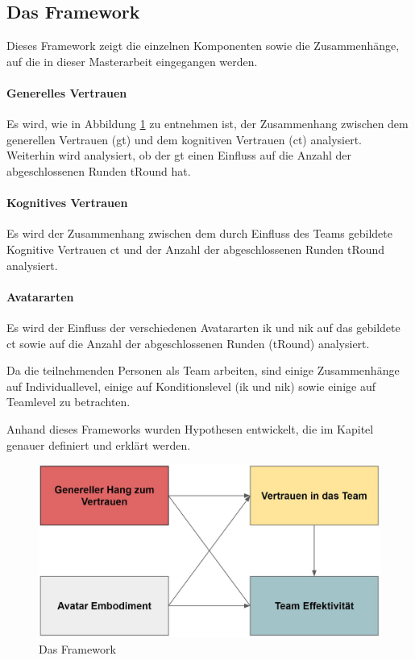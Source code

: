 \documentclass[a4paper,11pt]{article}%
\renewcommand{\\}{\vspace*{0.5\baselineskip} \newline}
\begin{document}
	\subsection{Das Framework}
Dieses Framework zeigt die einzelnen Komponenten sowie die Zusammenhänge, auf die in dieser Masterarbeit eingegangen werden. 

\paragraph{Generelles Vertrauen}
Es wird, wie in Abbildung \ref{Framework} zu entnehmen ist, der Zusammenhang zwischen dem generellen Vertrauen (\ac{gt}) und dem kognitiven Vertrauen (\ac{ct}) analysiert.
Weiterhin wird analysiert, ob der \ac{gt} einen Einfluss auf die Anzahl der abgeschlossenen Runden \ac{tRound} hat.

\paragraph{Kognitives Vertrauen}
Es wird der Zusammenhang zwischen dem durch Einfluss des Teams gebildete Kognitive Vertrauen \ac{ct} und der Anzahl der abgeschlossenen Runden \ac{tRound} analysiert.

\paragraph{Avatararten}
Es wird der Einfluss der verschiedenen Avatararten \ac{ik} und \ac{nik} auf das gebildete \ac{ct} sowie auf die Anzahl der abgeschlossenen Runden (\ac{tRound}) analysiert.

Da die teilnehmenden Personen als Team arbeiten, sind einige Zusammenhänge auf Individuallevel, einige auf Konditionslevel (\ac{ik} und \ac{nik}) sowie einige auf Teamlevel zu betrachten.

Anhand dieses Frameworks wurden Hypothesen entwickelt, die im Kapitel \textit{} genauer definiert und erklärt werden.

	\begin{figure}[H]
		\begin{footnotesize}
			\includegraphics[width=\textwidth]{Abbildungen/Framework_02.JPG}\\
			\caption[Abbildung 1]{Das Framework}
			\label{Framework}
		\end{footnotesize}
	\end{figure}
\end{document}
